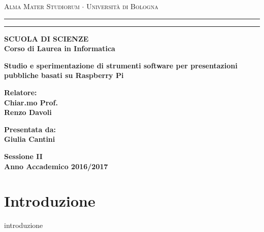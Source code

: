 \documentclass[12pt,a4paper,openright,twoside]{report}
\begin{document}
\begin{titlepage}
\begin{center}
\textwidth=450pt\oddsidemargin=0pt
{{\Large{\textsc{Alma Mater Studiorum $\cdot$ Universit\`a di
Bologna}}}} \rule[0.1cm]{15.8cm}{0.1mm}
\rule[0.5cm]{15.8cm}{0.6mm}
{\small{\bf SCUOLA DI SCIENZE\\
Corso di Laurea in Informatica }}
\end{center}
\vspace{15mm}

\begin{center}
{\LARGE{\bf Studio e sperimentazione di strumenti software per presentazioni pubbliche basati su Raspberry Pi}}\\
\vspace{3mm}
\end{center}

\vspace{40mm}
\par
\noindent
\begin{minipage}[t]{0.47\textwidth}
{\large{\bf Relatore:\\
Chiar.mo Prof.\\
Renzo Davoli}}
\end{minipage}
\hfill
\begin{minipage}[t]{0.47\textwidth}\raggedleft
{\large{\bf Presentata da:\\
Giulia Cantini}}
\end{minipage}
\vspace{20mm}
\begin{center}
{\large{\bf Sessione II\\%
Anno Accademico 2016/2017}}%
\end{center}
\end{titlepage}

\chapter*{Introduzione} %
{introduzione}

\clearpage{\pagestyle{empty}\cleardoublepage}
\tableofcontents %
\rhead[\fancyplain{}{\bfseries\leftmark}]{\fancyplain{}{\bfseries\thepage}}
\clearpage{\pagestyle{empty}\cleardoublepage} %
\listoffigures  %
\clearpage{\pagestyle{empty}\cleardoublepage}
\listoftables  %
\clearpage{\pagestyle{empty}\cleardoublepage} %
\end{document}
